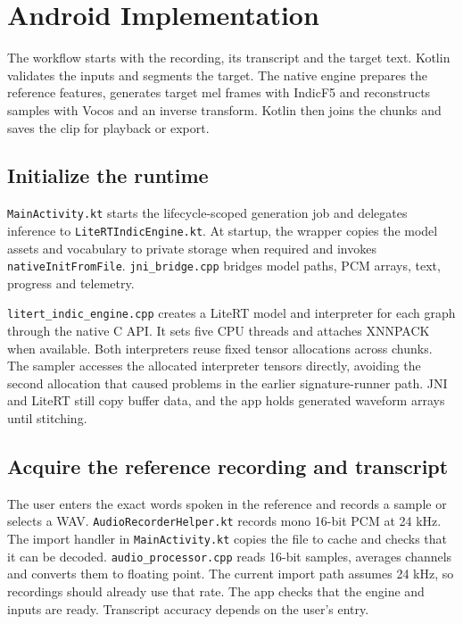 \chapter{Android Implementation}

The workflow starts with the recording, its transcript and the target text.
Kotlin validates the inputs and segments the target. The native engine
prepares the reference features, generates target mel frames with IndicF5
and reconstructs samples with Vocos and an inverse transform. Kotlin then
joins the chunks and saves the clip for playback or export.

\section{Initialize the runtime}

\texttt{MainActivity.kt} starts the lifecycle-scoped generation job and
delegates inference to \texttt{LiteRTIndicEngine.kt}. At startup, the
wrapper copies the model assets and vocabulary to private storage when
required and invokes \texttt{nativeInitFromFile}. \texttt{jni\_bridge.cpp}
bridges model paths, PCM arrays, text, progress and telemetry.

\texttt{litert\_indic\_engine.cpp} creates a LiteRT model and interpreter
for each graph through the native C API. It sets five CPU threads and
attaches XNNPACK when available. Both interpreters reuse fixed tensor
allocations across chunks. The sampler accesses the allocated interpreter
tensors directly, avoiding the second allocation that caused problems in
the earlier signature-runner path. JNI and LiteRT still copy buffer data,
and the app holds generated waveform arrays until stitching.

\section{Acquire the reference recording and transcript}

The user enters the exact words spoken in the reference and records a
sample or selects a WAV. \texttt{AudioRecorderHelper.kt} records mono
16-bit PCM at 24 kHz. The import handler in \texttt{MainActivity.kt}
copies the file to cache and checks that it can be decoded.
\texttt{audio\_processor.cpp} reads 16-bit samples, averages channels and
converts them to floating point. The current import path assumes 24 kHz,
so recordings should already use that rate. The app checks that the engine
and inputs are ready. Transcript accuracy depends on the user's entry.

